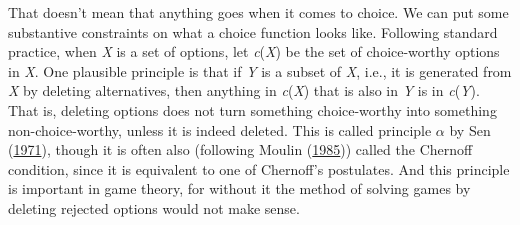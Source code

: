 \documentclass[
  12pt,
  letterpaper,
  DIV=11,
  numbers=noendperiod]{scrreprt}
\begin{document}
That doesn't mean that anything goes when it comes to choice. We can put
some substantive constraints on what a choice function looks like.
Following standard practice, when \emph{X} is a set of options, let
\emph{c}(\emph{X}) be the set of choice-worthy options in \emph{X}. One
plausible principle is that if \emph{Y} is a subset of \emph{X}, i.e.,
it is generated from \emph{X} by deleting alternatives, then anything in
\emph{c}(\emph{X}) that is also in \emph{Y} is in \emph{c}(\emph{Y}).
That is, deleting options does not turn something choice-worthy into
something non-choice-worthy, unless it is indeed deleted. This is called
principle \(\alpha\) by Sen (\protect\hyperlink{ref-Sen1971}{1971}),
though it is often also (following Moulin
(\protect\hyperlink{ref-Moulin1985}{1985})) called the Chernoff
condition, since it is equivalent to one of Chernoff's postulates. And
this principle is important in game theory, for without it the method of
solving games by deleting rejected options would not make sense.
\end{document}
